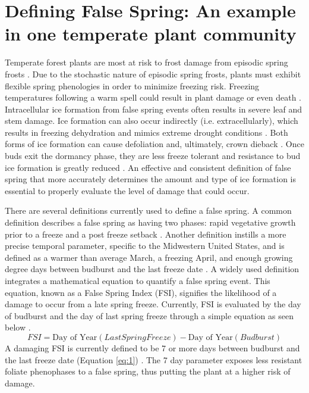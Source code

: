 \documentclass{article}\usepackage[]{graphicx}\usepackage[]{color}
\begin{document}
\section{Defining False Spring: An example in one temperate plant community}
Temperate forest plants are most at risk to frost damage from episodic spring frosts \citep{Sakai1987}. Due to the stochastic nature of episodic spring frosts, plants must exhibit flexible spring phenologies in order to minimize freezing risk. Freezing temperatures following a warm spell could result in plant damage or even death \citep{Ludlum1968, Mock2007}. Intracellular ice formation from false spring events often results in severe leaf and stem damage. Ice formation can also occur indirectly (i.e. extracellularly), which results in freezing dehydration and mimics extreme drought conditions \citep{Pearce2001, Beck2004, Hofmann2015}. Both forms of ice formation can cause defoliation and, ultimately, crown dieback \citep{Gu2008}. Once buds exit the dormancy phase, they are less freeze tolerant and resistance to bud ice formation is greatly reduced \citep{Taschler2004, Lenz2013, Vitasse2014b}. An effective and consistent definition of false spring that more accurately determines the amount and type of ice formation is essential to properly evaluate the level of damage that could occur.

There are several definitions currently used to define a false spring. A common definition describes a false spring as having two phases: rapid vegetative growth prior to a freeze and a post freeze setback \citep{Gu2008}. Another definition instills a more precise temporal parameter, specific to the Midwestern United States, and is defined as a warmer than average March, a freezing April, and enough growing degree days between budburst and the last freeze date \citep{Augspurger2013}. A widely used definition integrates a mathematical equation to quantify a false spring event. This equation, known as a False Spring Index (FSI), signifies the likelihood of a damage to occur from a late spring freeze. Currently, FSI is evaluated by the day of budburst and the day of last spring freeze through a simple equation as seen below \citep{Marino2011}. 
\begin{equation} \label{eq:1}
FSI = \text{Day of Year} (Last Spring Freeze) - \text{Day of Year} (Budburst)
\end{equation}
A damaging FSI is currently defined to be 7 or more days between budburst and the last freeze date (Equation \ref{eq:1}) \citep{Peterson2014}. The 7 day parameter exposes less resistant foliate phenophases to a false spring, thus putting the plant at a higher risk of damage. 
\end{document}
